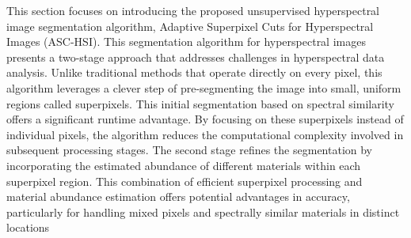 This section focuses on introducing the proposed unsupervised hyperspectral image segmentation algorithm, Adaptive Superpixel Cuts for Hyperspectral Images (ASC-HSI). This segmentation algorithm for hyperspectral images presents a two-stage approach that addresses challenges in hyperspectral data analysis. Unlike traditional methods that operate directly on every pixel, this algorithm leverages a clever step of pre-segmenting the image into small, uniform regions called superpixels. This initial segmentation based on spectral similarity offers a significant runtime advantage. By focusing on these superpixels instead of individual pixels, the algorithm reduces the computational complexity involved in subsequent processing stages. The second stage refines the segmentation by incorporating the estimated abundance of different materials within each superpixel region. This combination of efficient superpixel processing and material abundance estimation offers potential advantages in accuracy, particularly for handling mixed pixels and spectrally similar materials in distinct locations

  
